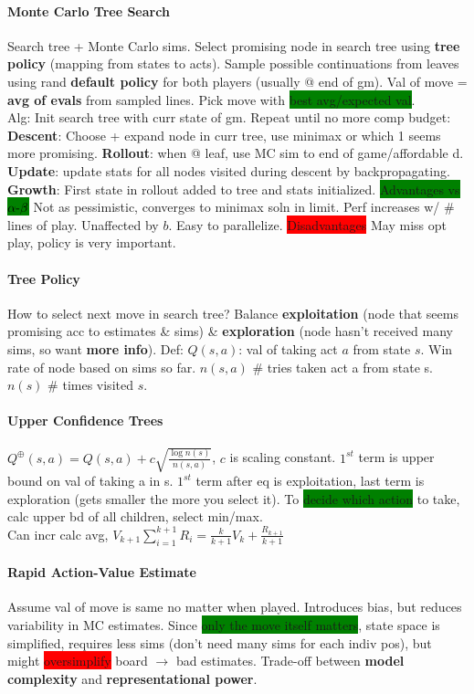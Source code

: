 \paragraph{Monte Carlo Tree Search} Search tree + Monte Carlo
sims. Select promising node in search tree using \textbf{tree policy}
(mapping from states to acts). Sample possible continuations from
leaves using rand \textbf{default policy} for both players (usually @
end of gm). Val of move = \textbf{avg of evals} from sampled
lines. Pick move with \colorbox{green}{best avg/expected val}.
\\ Alg: Init search tree with curr state of gm. Repeat until no more
comp budget: \textbf{Descent}: Choose + expand node in curr tree, use minimax
or which 1 seems more promising. \textbf{Rollout}: when @ leaf, use
MC sim to end of game/affordable d. \textbf{Update}: update stats for
all nodes visited during descent by backpropagating. \textbf{Growth}:
First state in rollout added to tree and stats initialized.
\colorbox{green}{Advantages vs $\alpha\hbox{-}\beta$} Not as
pessimistic, converges to minimax soln in limit. Perf increases w/ \#
lines of play. Unaffected by $b$. Easy to
parallelize. \colorbox{red}{Disadvantages} May miss opt play, policy
is very important.
\paragraph{Tree Policy} How to select next move in search tree?
Balance \textbf{exploitation} (node that seems promising acc to
estimates \& sims) \& \textbf{exploration} (node hasn't received many
sims, so want \textbf{more info}). Def: $Q(s,a)$: val of taking act
$a$ from state $s$. Win rate of node based on sims so far. $n(s,a)$
\# tries taken act a from state s. $n(s)$ \# times visited $s$.
\paragraph{Upper Confidence Trees}
$Q^{\oplus}(s,a)=Q(s,a)+c\sqrt{\frac{\log n(s)}{n(s,a)}}$, $c$ is
scaling constant. $1^{st}$ term is upper bound on val of taking a in
s.  $1^{st}$ term after eq is exploitation, last term is exploration
(gets smaller the more you select it). To \colorbox{green}{decide
  which action} to take, calc upper bd of all children, select
min/max.
\\ Can incr calc avg, $V_{k+1}\sum_{i=1}^{k+1}R_i = \frac{k}{k+1}V_{k}+\frac{R_{k+1}}{k+1}$
\paragraph{Rapid Action-Value Estimate} Assume val of move is same no
matter when played. Introduces bias, but reduces variability in MC
estimates. Since \colorbox{green}{only the move itself matters}, state
space is simplified, requires less sims (don't need many sims for each
indiv pos), but might \colorbox{red}{oversimplify} board $\to$ bad
estimates. Trade-off between \textbf{model complexity} and
\textbf{representational power}.
\color[HTML]{666666}
